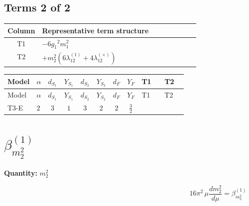 \documentclass[8pt]{article}
\begin{document}
\begin{landscape}
\subsection*{Terms 2 of 2}
\begin{center}
\begin{tabular}{@{}c >{\raggedright\arraybackslash}p{0.82\linewidth}@{}}
\toprule
Column & Representative term structure \\
\midrule
T1 & \(\displaystyle -6 {g_1}^2 {m_1^2}\) \\
\midrule
T2 & \(\displaystyle +{m_2^2} (6 {\lambda_{12}^{(1)}}+4 {\lambda_{12}^{(\times)}})\) \\
\midrule
\bottomrule
\end{tabular}
\end{center}
\smallskip
\tiny
\begin{longtable}{@{}llcccccc >{\raggedright\arraybackslash}p{0.21\linewidth} >{\raggedright\arraybackslash}p{0.21\linewidth}@{}}
\toprule
Model & $\alpha$ & $d_{S_1}$ & $Y_{S_1}$ & $d_{S_2}$ & $Y_{S_2}$ & $d_F$ & $Y_F$ & T1 & T2 \\
\midrule
\endfirsthead
\toprule
Model & $\alpha$ & $d_{S_1}$ & $Y_{S_1}$ & $d_{S_2}$ & $Y_{S_2}$ & $d_F$ & $Y_F$ & T1 & T2 \\
\midrule
\endhead
T3-E & $2$ & $3$ & $1$ & $3$ & $2$ & $2$ & $\frac{3}{2}$ & \scriptsize\adjustbox{max width=\linewidth}{$\begin{gathered} -6 {g_1}^2 {m_1^2}\end{gathered}$} & \scriptsize\adjustbox{max width=\linewidth}{$\begin{gathered} +{m_2^2} (6 {\lambda_{12}^{(1)}}+4 {\lambda_{12}^{(\times)}})\end{gathered}$} \\
\midrule
\bottomrule
\end{longtable}
\clearpage
\section*{$\beta_{m_2^2}^{(1)}$}
\noindent\textbf{Quantity: }$m_2^2$\par\smallskip
\[16\pi^2\,\mu\frac{d m_2^2}{d\mu}=\beta_{m_2^2}^{(1)}\]

\end{landscape}
\end{document}
